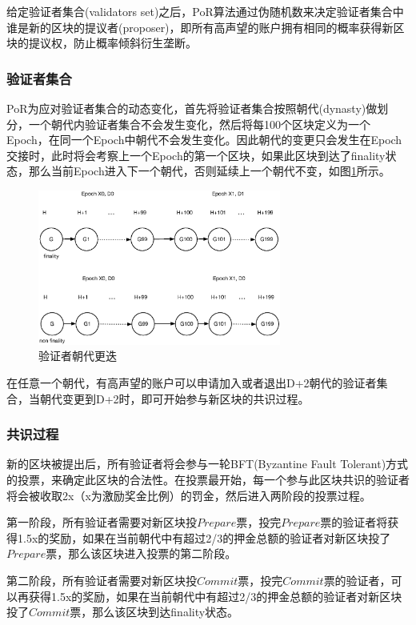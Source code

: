 给定验证者集合(validators set)之后，PoR算法通过伪随机数来决定验证者集合中谁是新的区块的提议者(proposer)，即所有高声望的账户拥有相同的概率获得新区块的提议权，防止概率倾斜衍生垄断。

\subsubsection{验证者集合}
\label{por:design:validators}

PoR为应对验证者集合的动态变化，首先将验证者集合按照朝代(dynasty)做划分，一个朝代内验证者集合不会发生变化，然后将每100个区块定义为一个Epoch，在同一个Epoch中朝代不会发生变化。因此朝代的变更只会发生在Epoch交接时，此时将会考察上一个Epoch的第一个区块，如果此区块到达了finality状态，那么当前Epoch进入下一个朝代，否则延续上一个朝代不变，如图\ref{fig:epoch}所示。

\begin{figure}[h]
\centering
\includegraphics[width=8cm]{./figs/epoch}
\caption{验证者朝代更迭}
\label{fig:epoch}
\end{figure}

在任意一个朝代，有高声望的账户可以申请加入或者退出D+2朝代的验证者集合，当朝代变更到D+2时，即可开始参与新区块的共识过程。

\subsubsection{共识过程}
\label{por:design:consensus}

新的区块被提出后，所有验证者将会参与一轮BFT(Byzantine Fault Tolerant)方式的投票，来确定此区块的合法性。在投票最开始，每一个参与此区块共识的验证者将会被收取2x（x为激励奖金比例）的罚金，然后进入两阶段的投票过程。

第一阶段，所有验证者需要对新区块投$Prepare$票，投完$Prepare$票的验证者将获得1.5x的奖励，如果在当前朝代中有超过2/3的押金总额的验证者对新区块投了$Prepare$票，那么该区块进入投票的第二阶段。

第二阶段，所有验证者需要对新区块投$Commit$票，投完$Commit$票的验证者，可以再获得1.5x的奖励，如果在当前朝代中有超过2/3的押金总额的验证者对新区块投了$Commit$票，那么该区块到达finality状态。

